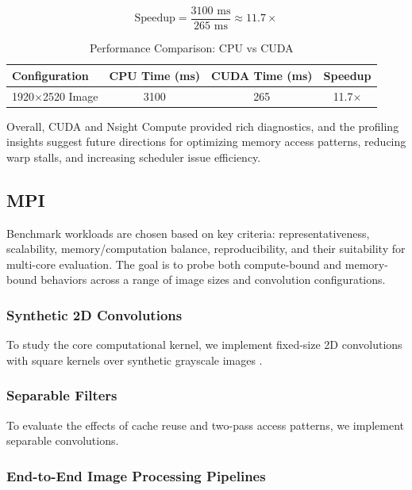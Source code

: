 \documentclass[conference, 10pt]{IEEEtran}
\begin{document}
\[
\text{Speedup} = \frac{3100\text{ ms}}{265\text{ ms}} \approx 11.7\times
\]

\begin{table}[H]
    \centering
    \caption{Performance Comparison: CPU vs CUDA}
    \label{tab:speedup-table}
    \begin{tabular}{@{}lccc@{}}
        \toprule
        \textbf{Configuration} & \textbf{CPU Time (ms)} & \textbf{CUDA Time (ms)} & \textbf{Speedup} \\
        \midrule
        1920$\times$2520 Image & 3100 & 265 & 11.7$\times$ \\
        \bottomrule
    \end{tabular}
\end{table}

Overall, CUDA and Nsight Compute provided rich diagnostics, and the profiling insights suggest future directions for optimizing memory access patterns, reducing warp stalls, and increasing scheduler issue efficiency.




\subsection{\textbf{MPI}}

Benchmark workloads are chosen based on key criteria: representativeness, scalability, memory/computation balance, reproducibility, and their suitability for multi-core evaluation. The goal is to probe both compute-bound and memory-bound behaviors across a range of image sizes and convolution configurations.

\subsubsection{\textbf{Synthetic 2D Convolutions}}

To study the core computational kernel, we implement fixed-size 2D convolutions with square kernels over synthetic grayscale images \cite{Tousimojarad2017}.


\subsubsection{\textbf{Separable Filters}}

To evaluate the effects of cache reuse and two-pass access patterns, we implement separable convolutions.



\subsubsection{\textbf{End-to-End Image Processing Pipelines}}
\end{document}

